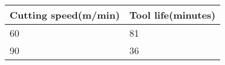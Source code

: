 \begin{tabular}{|l|l|}
\hline
\multicolumn{1}{|c|}{\textbf{Cutting speed(m/min)}}    & \multicolumn{1}{|c|}{\textbf{Tool life(minutes)}} \\
\hline
60 &81\\
\hline
90 &36\\
\hline
\end{tabular}